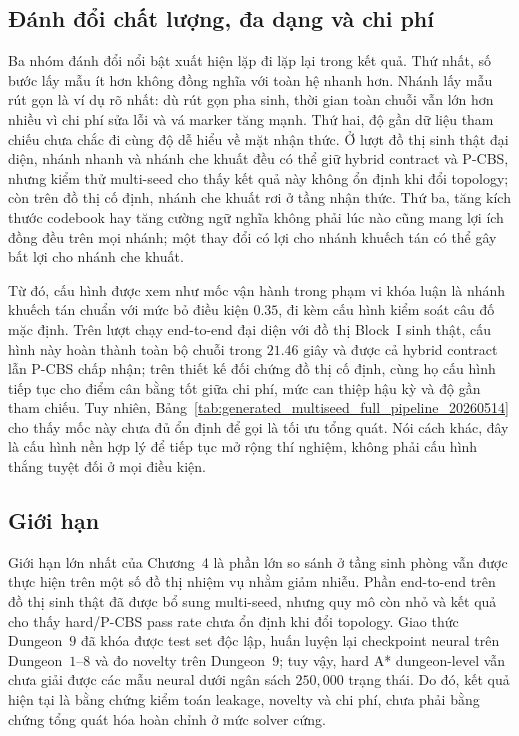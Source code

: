 \documentclass[oneside,a4paper,12pt]{extreport}
\begin{document}
\subsection{Đánh đổi chất lượng, đa dạng và chi phí}
Ba nhóm đánh đổi nổi bật xuất hiện lặp đi lặp lại trong kết quả. Thứ nhất, số bước lấy mẫu ít hơn không đồng nghĩa với toàn hệ nhanh hơn. Nhánh lấy mẫu rút gọn là ví dụ rõ nhất: dù rút gọn pha sinh, thời gian toàn chuỗi vẫn lớn hơn nhiều vì chi phí sửa lỗi và vá marker tăng mạnh. Thứ hai, độ gần dữ liệu tham chiếu chưa chắc đi cùng độ dễ hiểu về mặt nhận thức. Ở lượt đồ thị sinh thật đại diện, nhánh nhanh và nhánh che khuất đều có thể giữ hybrid contract và P-CBS, nhưng kiểm thử multi-seed cho thấy kết quả này không ổn định khi đổi topology; còn trên đồ thị cố định, nhánh che khuất rơi ở tầng nhận thức. Thứ ba, tăng kích thước codebook hay tăng cường ngữ nghĩa không phải lúc nào cũng mang lợi ích đồng đều trên mọi nhánh; một thay đổi có lợi cho nhánh khuếch tán có thể gây bất lợi cho nhánh che khuất.

Từ đó, cấu hình được xem như mốc vận hành trong phạm vi khóa luận là nhánh khuếch tán chuẩn với mức bỏ điều kiện $0.35$, đi kèm cấu hình kiểm soát câu đố mặc định. Trên lượt chạy end-to-end đại diện với đồ thị Block~I sinh thật, cấu hình này hoàn thành toàn bộ chuỗi trong \textbf{$21.46$} giây và được cả hybrid contract lẫn P-CBS chấp nhận; trên thiết kế đối chứng đồ thị cố định, cùng họ cấu hình tiếp tục cho điểm cân bằng tốt giữa chi phí, mức can thiệp hậu kỳ và độ gần tham chiếu. Tuy nhiên, Bảng~\ref{tab:generated_multiseed_full_pipeline_20260514} cho thấy mốc này chưa đủ ổn định để gọi là tối ưu tổng quát. Nói cách khác, đây là cấu hình nền hợp lý để tiếp tục mở rộng thí nghiệm, không phải cấu hình thắng tuyệt đối ở mọi điều kiện.

\subsection{Giới hạn}
Giới hạn lớn nhất của Chương~4 là phần lớn so sánh ở tầng sinh phòng vẫn được thực hiện trên một số đồ thị nhiệm vụ nhằm giảm nhiễu. Phần end-to-end trên đồ thị sinh thật đã được bổ sung multi-seed, nhưng quy mô còn nhỏ và kết quả cho thấy hard/P-CBS pass rate chưa ổn định khi đổi topology. Giao thức Dungeon~$9$ đã khóa được test set độc lập, huấn luyện lại checkpoint neural trên Dungeon~$1$--$8$ và đo novelty trên Dungeon~$9$; tuy vậy, hard A* dungeon-level vẫn chưa giải được các mẫu neural dưới ngân sách $250{,}000$ trạng thái. Do đó, kết quả hiện tại là bằng chứng kiểm toán leakage, novelty và chi phí, chưa phải bằng chứng tổng quát hóa hoàn chỉnh ở mức solver cứng.
\end{document}
